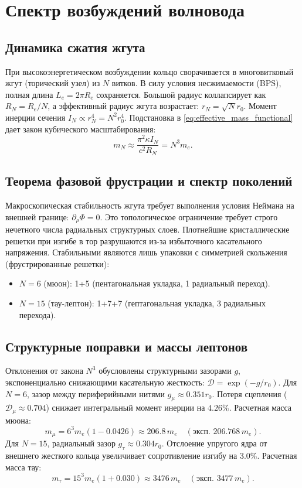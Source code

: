 \documentclass[12pt,a4paper]{article}
\begin{document}
\section{Спектр возбуждений волновода}

\subsection{Динамика сжатия жгута}
При высокоэнергетическом возбуждении кольцо сворачивается в многовитковый жгут (торический узел) из $N$ витков. В силу условия несжимаемости (BPS), полная длина $L_e = 2\pi R_e$ сохраняется. Большой радиус коллапсирует как $R_N = R_e / N$, а эффективный радиус жгута возрастает: $r_N = \sqrt{N} r_0$.
Момент инерции сечения $I_N \propto r_N^4 = N^2 r_0^4$. Подстановка в \eqref{eq:effective_mass_functional} дает закон кубического масштабирования:
\begin{equation}
m_N \approx \frac{\pi^2 \kappa I_N}{c^2 R_N} = N^3 m_e.
\label{eq:cubic_law}
\end{equation}

\subsection{Теорема фазовой фрустрации и спектр поколений}
Макроскопическая стабильность жгута требует выполнения условия Неймана на внешней границе: $\partial_\rho \Phi = 0$. Это топологическое ограничение требует строго нечетного числа радиальных структурных слоев.
Плотнейшие кристаллические решетки при изгибе в тор разрушаются из-за избыточного касательного напряжения. Стабильными являются лишь упаковки с симметрией скольжения (фрустрированные решетки):
\begin{itemize}
    \item $N=6$ (мюон): 1+5 (пентагональная укладка, 1 радиальный переход).
    \item $N=15$ (тау-лептон): 1+7+7 (гептагональная укладка, 3 радиальных перехода).
\end{itemize}

\subsection{Структурные поправки и массы лептонов}
Отклонения от закона $N^3$ обусловлены структурными зазорами $g$, экспоненциально снижающими касательную жесткость: $\mathcal{D} = \exp(-g/r_0)$.
Для $N=6$, зазор между периферийными нитями $g_\mu \approx 0.351 r_0$. Потеря сцепления ($\mathcal{D}_\mu \approx 0.704$) снижает интегральный момент инерции на $4.26\%$. Расчетная масса мюона:
\begin{equation}
m_\mu = 6^3 m_e (1 - 0.0426) \approx 206.8 \, m_e \quad (\text{эксп. } 206.768 \, m_e).
\end{equation}
Для $N=15$, радиальный зазор $g_\tau \approx 0.304 r_0$. Отслоение упругого ядра от внешнего жесткого кольца увеличивает сопротивление изгибу на $3.0\%$. Расчетная масса тау:
\begin{equation}
m_\tau = 15^3 m_e (1 + 0.030) \approx 3476 \, m_e \quad (\text{эксп. } 3477 \, m_e).
\end{equation}
\end{document}
